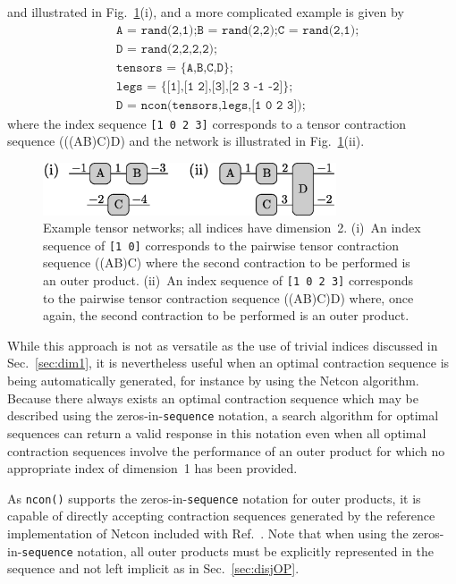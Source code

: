 \documentclass[aps,prb,reprint,superscriptaddress,amsmath,amsfonts]{revtex4-1}
\theoremstyle{definition}
\newcommand{\fref}[1]{Fig.~\ref{#1}}
\newcommand{\sref}[1]{Sec.~\ref{#1}}
\newcommand{\aref}[1]{Sec.~\ref{#1}}
\newcommand{\rcite}[1]{Ref.~\onlinecite{#1}}
\newcommand{\ttt}[1]{\texttt{#1}}
\newcommand{\z}{}
\begin{document}
and illustrated in \fref{fig:zeroex}(i), and a more complicated example is given by
\begin{align*}
&\ttt{A = rand(2,1);B = rand(2,2);C = rand(2,1);}\\
&\ttt{D = rand(2,2,2,2);}\\
&\ttt{tensors = \{A,B,C,D\};}\\
&\ttt{legs = \{[1],[1 2],[3],[2 3 -1 -2]\};}\\
&\ttt{D = ncon(tensors,legs,[1 0 2 3]);}
\end{align*}
where the index sequence \ttt{[1 0 2 3]} corresponds to a tensor contraction sequence (((A\z{}B)\z{}C)\z{}D) and the network is illustrated in \fref{fig:zeroex}(ii). %
\begin{figure}
\includegraphics[width=246.0pt]{zeroex}
\caption{Example tensor networks; all indices have dimension~2. (i)~An index sequence of \ttt{[1 0]} corresponds to the pairwise tensor contraction sequence ((A\z{}B)\z{}C) where the second contraction to be performed is an outer product. (ii)~An index sequence of \ttt{[1 0 2 3]} corresponds to the pairwise tensor contraction sequence ((A\z{}B)\z{}C)\z{}D) where, once again, the second contraction to be performed is an outer product.\label{fig:zeroex}}
\end{figure}%

While this approach is not as versatile as the use of trivial indices discussed in \aref{sec:dim1}, it is nevertheless useful when an optimal contraction sequence is being automatically generated, for instance by using the Netcon algorithm.\cite{pfeifer2013a} Because there always exists an optimal contraction sequence which may be described using the zeros-in-\ttt{sequence} notation, a search algorithm for optimal sequences can return a valid response in this notation even when all optimal contraction sequences %
involve the performance of
an outer product for which no appropriate 
index of dimension~1 has been provided. 


As \ttt{ncon()} supports the zeros-in-\ttt{sequence} notation for outer products, it is capable of directly accepting contraction sequences generated by the reference implementation of Netcon included with \rcite{pfeifer2013a}. Note that when using the zeros-in-\ttt{sequence} notation, all outer products must be explicitly represented in the sequence and not left implicit as in \sref{sec:disjOP}.
\end{document}
